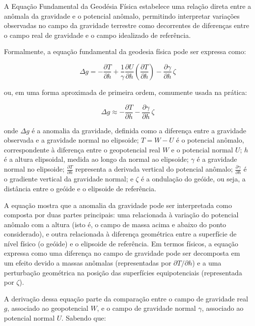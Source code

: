 A Equação Fundamental da Geodésia Física estabelece uma relação direta entre a anômala da gravidade e o potencial anômalo, permitindo interpretar variações observadas no campo da gravidade terrestre como decorrentes de diferenças entre o campo real de gravidade e o campo idealizado de referência. 

Formalmente, a equação fundamental da geodesia física pode ser expressa como:

\[
\Delta g = -\frac{\partial T}{\partial h} + \frac{1}{\gamma} \frac{\partial U}{\partial h} \left( \frac{\partial T}{\partial h} \right) - \frac{\partial \gamma}{\partial h} \, \zeta
\]

\noindent
ou, em uma forma aproximada de primeira ordem, comumente usada na prática:

\[
\Delta g \approx -\frac{\partial T}{\partial h} - \frac{\partial \gamma}{\partial h} \, \zeta
\]

\noindent
onde \( \Delta g \) é a anomalia da gravidade, definida como a diferença entre a gravidade observada e a gravidade normal no elipsoide; \( T = W - U \) é o potencial anômalo, correspondente à diferença entre o geopotencial real \( W \) e o potencial normal \( U \); \( h \) é a altura elipsoidal, medida ao longo da normal ao elipsoide; \( \gamma \) é a gravidade normal no elipsoide; \( \frac{\partial T}{\partial h} \) representa a derivada vertical do potencial anômalo; \( \frac{\partial \gamma}{\partial h} \) é o gradiente vertical da gravidade normal; e \( \zeta \) é a ondulação do geóide, ou seja, a distância entre o geóide e o elipsoide de referência.

A equação mostra que a anomalia da gravidade pode ser interpretada como composta por duas partes principais: uma relacionada à variação do potencial anômalo com a altura (isto é, o campo de massa acima e abaixo do ponto considerado), e outra relacionada à diferença geométrica entre a superfície de nível físico (o geóide) e o elipsoide de referência. Em termos físicos, a equação expressa como uma diferença no campo de gravidade pode ser decomposta em um efeito devido a massas anômalas (representadas por \( \partial T/\partial h \)) e a uma perturbação geométrica na posição das superfícies equipotenciais (representada por \( \zeta \)).

A derivação dessa equação parte da comparação entre o campo de gravidade real \( g \), associado ao geopotencial \( W \), e o campo de gravidade normal \( \gamma \), associado ao potencial normal \( U \). Sabendo que:

